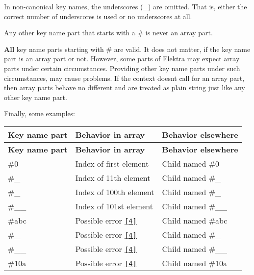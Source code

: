 In non-\/canonical key names, the underscores ({\ttfamily \+\_\+}) are omitted. That is, either the correct number of underscores is used or no underscores at all.

Any other key name part that starts with a {\ttfamily \#} is never an array part.

{\bfseries All} key name parts starting with {\ttfamily \#} are valid. It does not matter, if the key name part is an array part or not. However, some parts of Elektra may expect array parts under certain circumstances. Providing other key name parts under such circumstances, may cause problems. If the context doesn\textquotesingle{}t call for an array part, then array parts behave no different and are treated as plain string just like any other key name part.

Finally, some examples\+:

\tabulinesep=1mm
\begin{longtabu} spread 0pt [c]{*{3}{|X[-1]}|}
\hline
\rowcolor{\tableheadbgcolor}\textbf{ Key name part }&\textbf{ Behavior in array }&\textbf{ Behavior elsewhere  }\\
\endfirsthead
\hline
\endfoot
\hline
\rowcolor{\tableheadbgcolor}\textbf{ Key name part }&\textbf{ Behavior in array }&\textbf{ Behavior elsewhere  }\\
\endhead
{\ttfamily \#0} &Index of first element &Child named {\ttfamily \#0} \\
{\ttfamily \#\+\_} &Index of 11th element &Child named {\ttfamily \#\+\_} \\
{\ttfamily \#\+\_} &Index of 100th element &Child named {\ttfamily \#\+\_} \\
{\ttfamily \#\+\_\+\+\_} &Index of 101st element &Child named {\ttfamily \#\+\_\+\+\_} \\
{\ttfamily \#abc} &Possible error \href{#footnote-4}{\tt \mbox{[}4\mbox{]}} &Child named {\ttfamily \#abc} \\
{\ttfamily \#\+\_} &Possible error \href{#footnote-4}{\tt \mbox{[}4\mbox{]}} &Child named {\ttfamily \#\+\_} \\
{\ttfamily \#\+\_\+\+\_} &Possible error \href{#footnote-4}{\tt \mbox{[}4\mbox{]}} &Child named {\ttfamily \#\+\_\+\+\_} \\
{\ttfamily \#10a} &Possible error \href{#footnote-4}{\tt \mbox{[}4\mbox{]}} &Child named {\ttfamily \#10a} \\
\end{longtabu}


